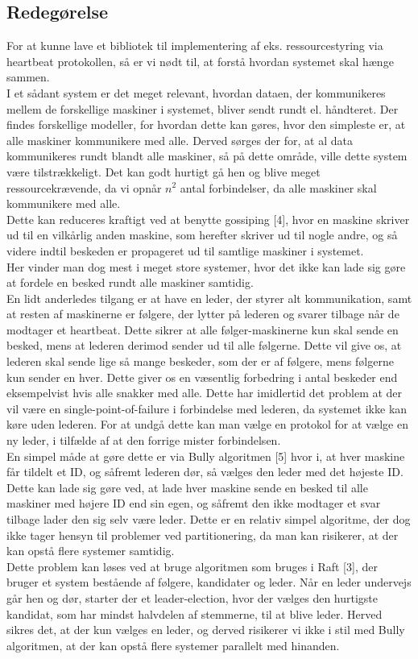 \documentclass[a4paper,12pt]{article}
\begin{document}
\subsection{Redegørelse}
For at kunne lave et bibliotek til implementering af eks. ressourcestyring via heartbeat protokollen, så er vi nødt til, at forstå hvordan systemet skal hænge sammen.
\\
I et sådant system er det meget relevant, hvordan dataen, der kommunikeres mellem de forskellige maskiner i systemet, bliver sendt rundt el. håndteret.
Der findes forskellige modeller, for hvordan dette kan gøres, hvor den simpleste er, at alle maskiner kommunikere med alle.
Derved sørges der for, at al data kommunikeres rundt blandt alle maskiner, så på dette område, ville dette system være tilstrækkeligt. 
Det kan godt hurtigt gå hen og blive meget ressourcekrævende, da vi opnår $n^2$ antal forbindelser, da alle maskiner skal kommunikere med alle.
\\[5px]
Dette kan reduceres kraftigt ved at benytte gossiping [4], hvor en maskine skriver ud til en vilkårlig anden maskine, som herefter skriver ud til nogle andre, og så videre indtil beskeden er propageret ud til samtlige maskiner i systemet.
\\
Her vinder man dog mest i meget store systemer, hvor det ikke kan lade sig gøre at fordele en besked rundt alle maskiner samtidig.
\\[5px]
En lidt anderledes tilgang er at have en leder, der styrer alt kommunikation, samt at resten af maskinerne er følgere, der lytter på lederen og svarer tilbage når de modtager et heartbeat. Dette sikrer at alle følger-maskinerne kun skal sende en besked, mens at lederen derimod sender ud til alle følgerne. Dette vil give os, at lederen skal sende lige så mange beskeder, som der er af følgere, mens følgerne kun sender en hver. 
Dette giver os en væsentlig forbedring i antal beskeder end eksempelvist hvis alle snakker med alle. Dette har imidlertid det problem at der vil være en single-point-of-failure i forbindelse med lederen, da systemet ikke kan køre uden lederen. For at undgå dette kan man vælge en protokol for at vælge en ny leder, i tilfælde af at den forrige mister forbindelsen. 
\\[5px]
En simpel måde at gøre dette er via Bully algoritmen [5] hvor i, at hver maskine får tildelt et ID, og såfremt lederen dør, så vælges den leder med det højeste ID. Dette kan lade sig gøre ved, at lade hver maskine sende en besked til alle maskiner med højere ID end sin egen, og såfremt den ikke modtager et svar tilbage lader den sig selv være leder. Dette er en relativ simpel algoritme, der dog ikke tager hensyn til problemer ved partitionering, da man kan risikerer, at der kan opstå flere systemer samtidig. 
\\[5px]
Dette problem kan løses ved at bruge algoritmen som bruges i Raft [3], der bruger et system bestående af følgere, kandidater og leder.
Når en leder undervejs går hen og dør, starter der et leader-election, hvor der vælges den hurtigste kandidat, som har mindst halvdelen af stemmerne, til at blive leder. Herved sikres det, at der kun vælges en leder, og derved risikerer vi ikke i stil med Bully algoritmen, at der kan opstå flere systemer parallelt med hinanden.
\newpage
  
\end{document}
